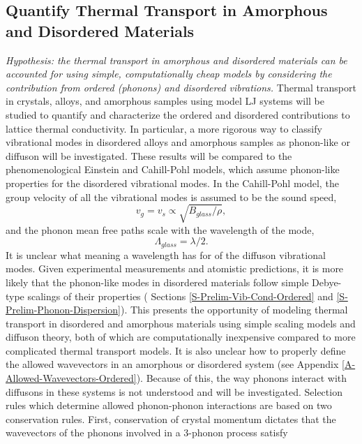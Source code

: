 \documentclass[letterpaper,12pt]{article}
\begin{document}
\subsection{\label{S-Research-Objectives-1}Quantify Thermal Transport in Amorphous and Disordered Materials}
\textit{Hypothesis: the thermal transport in amorphous and disordered materials can be accounted for using simple, computationally cheap models by considering the contribution from ordered (phonons) and disordered vibrations.}
Thermal transport in crystals, alloys, and amorphous samples using model LJ systems will be studied to quantify and characterize the ordered and disordered contributions to lattice thermal conductivity. In particular, a more rigorous way to classify vibrational modes in disordered alloys and amorphous samples as phonon-like or diffuson will be investigated. These results will be compared to the phenomenological Einstein and Cahill-Pohl models,\cite{einstein1911,kittel1949,cahill1992} which assume phonon-like properties for the disordered vibrational modes. In the Cahill-Pohl model,\cite{PhysRevB.46.6131} the group velocity of all the vibrational modes is assumed to be the sound speed,
\begin{equation}\label{E-Seq}
v_g = v_s \propto \sqrt{B_{glass}/\rho},
\end{equation}
and the phonon mean free paths scale with the wavelength of the mode,
\begin{equation}\label{EQ:M:l_glass}
\Lambda_{glass} = \lambda /2.
\end{equation}
It is unclear what meaning a wavelength has for of the diffuson vibrational modes. 
Given experimental measurements\cite{Moon_2002,PhysRevLett.102.035901,PhysRevB.81.104203,Zink_Pietri_Hellman_2006} and atomistic predictions,\cite{shenogin2009,He2011a} it is more likely that the phonon-like modes in disordered materials follow simple Debye-type scalings of their properties ( Sections \ref{S-Prelim-Vib-Cond-Ordered} and \ref{S-Prelim-Phonon-Dispersion}). This presents the opportunity of modeling thermal transport in disordered and amorphous materials using simple scaling models and diffuson theory, both of which are computationally inexpensive compared to more complicated thermal transport models.\cite{turney2008b}
It is also unclear how to properly define the allowed wavevectors in an amorphous or disordered system (see Appendix \ref{A-Allowed-Wavevectors-Ordered}). Because of this, the way phonons interact with diffusons in these systems is not understood and will be investigated. Selection rules which determine allowed phonon-phonon interactions are based on two conservation rules. First, conservation of crystal momentum dictates that the wavevectors of the phonons involved in a 3-phonon process satisfy
\end{document}

